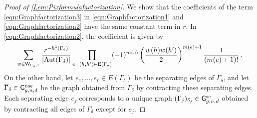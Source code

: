\documentclass[a4paper,12pt]{article} %
\def\Aut{{\rm Aut}}
\def\E{\mathrm{E}}
\def\G{\mathsf{G}}
\theoremstyle{definition}
\theoremstyle{plain}%
\begin{document}
\begin{proof}[Proof of \cref{Lem:Pixformulafactorization}]
We show that the coefficients of the term \eqref{eqn:Graphfactorization3} in \eqref{eqn:Graphfactorization1} and \eqref{eqn:Graphfactorization2} have the same constant term in $r$. In \eqref{eqn:Graphfactorization2}, the coefficient is given by
\begin{equation} \label{eqn:Graphfaccoeff1}
    \sum_{
w\in \mathsf{W}_{\Gamma_\delta,r}}
\frac{r^{-h^1(\Gamma_\delta)}}{|\Aut(\Gamma_\delta)| }
\prod_{e=(h,h')\in \E(\Gamma_\delta)}
 (-1)^{m(e)} \left(\frac{w(h)w(h')}{2}\right)^{m(e)+1} \frac{1}{(m(e)+1)!}\, .
\end{equation}
On the other hand, let $e_1, \ldots, e_\ell \in E(\Gamma_\delta)$ be the separating edges of $\Gamma_\delta$, and let $\overline{\Gamma}_{\delta} \in \G_{g,n,d}^\textup{nse}$ be the graph obtained from $\Gamma_\delta$ by contracting these separating edges. Each separating edge $e_j$ corresponds to a unique graph $(\Gamma_j)_{\delta_j} \in \G_{g,n,d}^\textup{se}$ obtained by contracting all edges of $\Gamma_\delta$ except for $e_j$. 


\end{proof}
\end{document}
